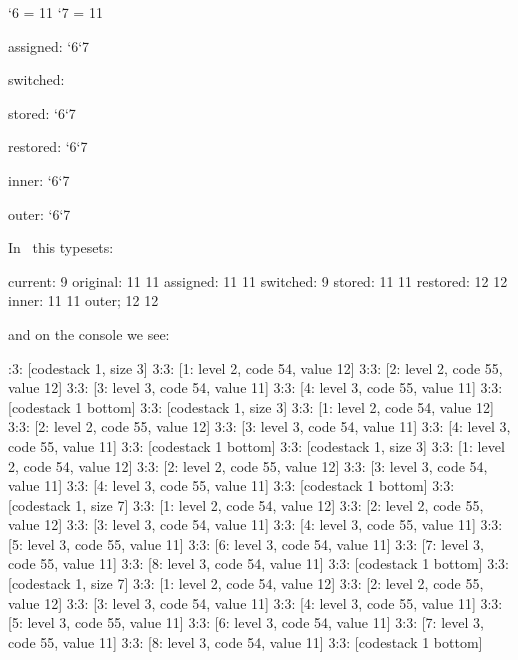     \catcode`6 = 11 \catcode`7 = 11

    \showcodestack\catcode

    assigned: \the\catcode`6\quad \the\catcode`7

    \showcodestack\catcode

    \catcodetable\ctxcatcodes switched: \the\catcodetable

    stored: \the\catcode`6\quad \the\catcode`7

    \showcodestack\catcode

    \restorecatcodetable\ctxcatcodes

    \showcodestack\catcode

    restored: \the\catcode`6\quad \the\catcode`7

    \showcodestack\catcode

    \egroup

    \catcodetable\ctxcatcodes

    inner: \the\catcode`6\quad\the\catcode`7

\egroup

outer: \the\catcode`6\quad\the\catcode`7
\stoptyping

In \CONTEXT\ this typesets:

\starttyping
current: 9
original: 11 11
assigned: 11 11
switched: 9
stored: 11 11
restored: 12 12
inner: 11 11
outer; 12 12
\stoptyping

and on the console we see:

:3: [codestack 1, size 3]
3:3: [1: level 2, code 54, value 12]
3:3: [2: level 2, code 55, value 12]
3:3: [3: level 3, code 54, value 11]
3:3: [4: level 3, code 55, value 11]
3:3: [codestack 1 bottom]
3:3: [codestack 1, size 3]
3:3: [1: level 2, code 54, value 12]
3:3: [2: level 2, code 55, value 12]
3:3: [3: level 3, code 54, value 11]
3:3: [4: level 3, code 55, value 11]
3:3: [codestack 1 bottom]
3:3: [codestack 1, size 3]
3:3: [1: level 2, code 54, value 12]
3:3: [2: level 2, code 55, value 12]
3:3: [3: level 3, code 54, value 11]
3:3: [4: level 3, code 55, value 11]
3:3: [codestack 1 bottom]
3:3: [codestack 1, size 7]
3:3: [1: level 2, code 54, value 12]
3:3: [2: level 2, code 55, value 12]
3:3: [3: level 3, code 54, value 11]
3:3: [4: level 3, code 55, value 11]
3:3: [5: level 3, code 55, value 11]
3:3: [6: level 3, code 54, value 11]
3:3: [7: level 3, code 55, value 11]
3:3: [8: level 3, code 54, value 11]
3:3: [codestack 1 bottom]
3:3: [codestack 1, size 7]
3:3: [1: level 2, code 54, value 12]
3:3: [2: level 2, code 55, value 12]
3:3: [3: level 3, code 54, value 11]
3:3: [4: level 3, code 55, value 11]
3:3: [5: level 3, code 55, value 11]
3:3: [6: level 3, code 54, value 11]
3:3: [7: level 3, code 55, value 11]
3:3: [8: level 3, code 54, value 11]
3:3: [codestack 1 bottom]
\stoptyping

